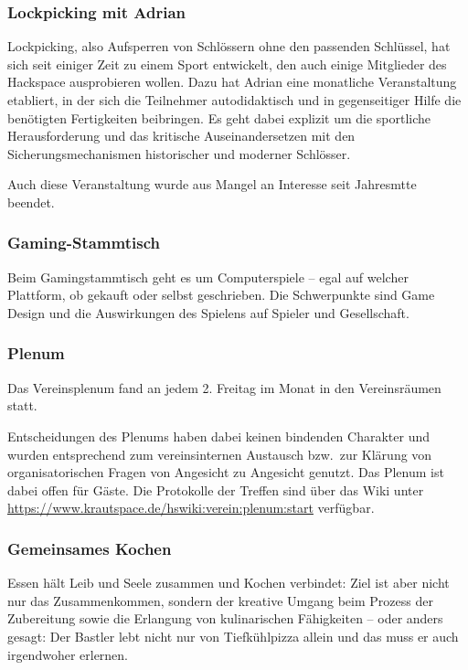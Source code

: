 \documentclass[10pt,DIV16]{scrartcl}
\begin{document}
\subsubsection{Lockpicking mit Adrian}

Lockpicking, also Aufsperren von Schlössern ohne den passenden
Schlüssel, hat sich seit einiger Zeit zu einem Sport entwickelt, den
auch einige Mitglieder des Hackspace ausprobieren wollen. Dazu hat
Adrian eine monatliche Veranstaltung etabliert, in der sich die Teilnehmer
autodidaktisch und in gegenseitiger Hilfe die benötigten Fertigkeiten
beibringen. Es geht dabei explizit um die sportliche Herausforderung
und das kritische Auseinandersetzen mit den Sicherungsmechanismen
historischer und moderner Schlösser.

Auch diese Veranstaltung wurde aus Mangel an Interesse seit Jahresmtte beendet. 

\subsubsection{Gaming-Stammtisch}

Beim Gamingstammtisch geht es um Computerspiele – egal auf welcher Plattform, ob gekauft oder selbst geschrieben.
Die Schwerpunkte sind Game Design und die Auswirkungen des Spielens auf Spieler und Gesellschaft. 

\subsubsection{Plenum}

Das Vereinsplenum fand an jedem 2. Freitag im Monat in den
Vereinsräumen statt.

Entscheidungen des Plenums haben dabei keinen bindenden Charakter und
wurden entsprechend zum vereinsinternen Austausch bzw.\ zur Klärung von
organisatorischen Fragen von Angesicht zu Angesicht genutzt. Das Plenum ist dabei offen für Gäste.
Die Protokolle der Treffen sind über das Wiki unter
\url{https://www.krautspace.de/hswiki:verein:plenum:start} verfügbar.

\subsubsection{Gemeinsames Kochen}

Essen hält Leib und Seele zusammen und Kochen verbindet:
Ziel ist aber nicht nur das Zusammenkommen, sondern der kreative Umgang
beim Prozess der Zubereitung sowie die Erlangung von kulinarischen
Fähigkeiten -- oder anders gesagt: Der Bastler lebt nicht nur von
Tiefkühlpizza allein und das muss er auch irgendwoher erlernen.
\end{document}
